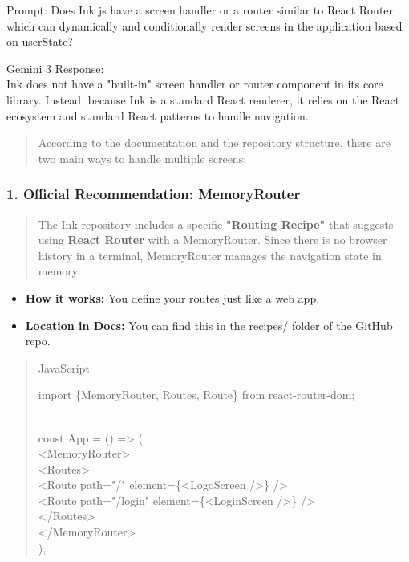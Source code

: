 Prompt: Does Ink js have a screen handler or a router similar to React
Router which can dynamically and conditionally render screens in the
application based on userState?

Gemini 3 Response:\\
Ink does not have a "built-in" screen handler or router component in its
core library. Instead, because Ink is a standard React renderer, it
relies on the React ecosystem and standard React patterns to handle
navigation.

\begin{quote}
According to the documentation and the repository structure, there are
two main ways to handle multiple screens:
\end{quote}

\hypertarget{official-recommendation-memoryrouter}{%
\subsubsection{\texorpdfstring{\textbf{1. Official Recommendation:
MemoryRouter}}{1. Official Recommendation: MemoryRouter}}\label{official-recommendation-memoryrouter}}

\begin{quote}
The Ink repository includes a specific \textbf{"Routing Recipe"} that
suggests using \textbf{React Router} with a MemoryRouter. Since there is
no browser history in a terminal, MemoryRouter manages the navigation
state in memory.
\end{quote}

\begin{itemize}
\item
  \textbf{How it works:} You define your routes just like a web app.
\item
  \textbf{Location in Docs:} You can find this in the recipes/ folder of
  the GitHub repo.
\end{itemize}

\begin{quote}
JavaScript

import \{MemoryRouter, Routes, Route\} from
\textquotesingle react-router-dom\textquotesingle;\\
\strut \\
const App = () =\textgreater{} (\\
\textless MemoryRouter\textgreater{}\\
\textless Routes\textgreater{}\\
\textless Route path="/" element=\{\textless LogoScreen /\textgreater\}
/\textgreater{}\\
\textless Route path="/login" element=\{\textless LoginScreen
/\textgreater\} /\textgreater{}\\
\textless/Routes\textgreater{}\\
\textless/MemoryRouter\textgreater{}\\
);
\end{quote}

